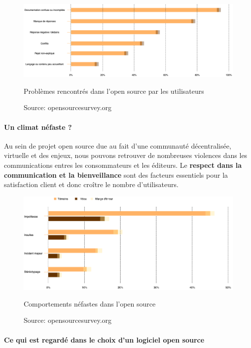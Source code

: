				\begin{figure}[!htb]
					\center
					\includegraphics[scale=0.50]{./img/pb_os.png}
					\caption{Problèmes rencontrés dans l'open source par les utilisateurs}
   					\caption*{\color{silver}Source: opensourcesurvey.org}
				\end{figure}
				

			\paragraph{Un climat néfaste ?\\}

				Au sein de projet open source due au fait d'une communauté décentralisée, virtuelle et des enjeux, nous pouvons retrouver de nombreuses violences dans les communications entres les consommateurs et les éditeurs. Le \textbf{respect dans la communication et la bienveillance} sont des facteurs essentiels pour la satisfaction client et donc croître le nombre d'utilisateurs.

				\begin{figure}[!htb]
					\center
					\includegraphics[scale=0.50]{./img/ng_behaviour_os.png}
					\caption{Comportements néfastes dans l'open source}
   					\caption*{\color{silver}Source: opensourcesurvey.org}
				\end{figure}

			\paragraph{Ce qui est regardé dans le choix d'un logiciel open source\\}

